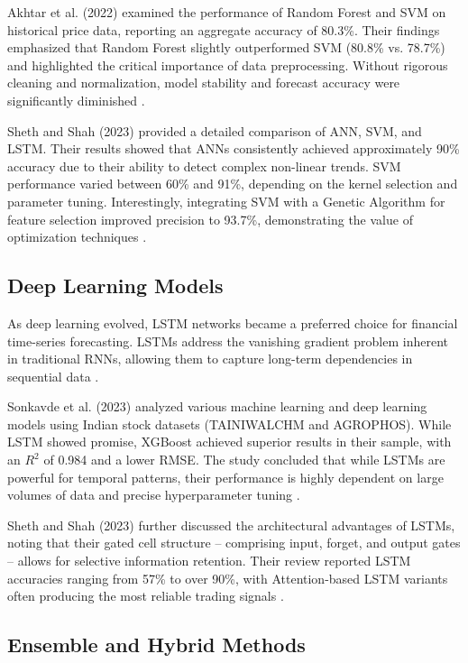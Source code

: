 \documentclass[11pt,a4paper]{article}
\begin{document}
Akhtar et al. (2022) examined the performance of Random Forest and SVM on historical price data,
reporting an aggregate accuracy of 80.3\%. Their findings emphasized that Random Forest slightly
outperformed SVM (80.8\% vs. 78.7\%) and highlighted the critical importance of data preprocessing.
Without rigorous cleaning and normalization, model stability and forecast accuracy were significantly
diminished \cite{akhtar2022}.

Sheth and Shah (2023) provided a detailed comparison of ANN, SVM, and LSTM. Their results showed
that ANNs consistently achieved approximately 90\% accuracy due to their ability to detect complex
non-linear trends. SVM performance varied between 60\% and 91\%, depending on the kernel selection
and parameter tuning. Interestingly, integrating SVM with a Genetic Algorithm for feature selection
improved precision to 93.7\%, demonstrating the value of optimization techniques \cite{sheth2023}.

\subsection{Deep Learning Models}

As deep learning evolved, LSTM networks became a preferred choice for financial time-series
forecasting. LSTMs address the vanishing gradient problem inherent in traditional RNNs, allowing
them to capture long-term dependencies in sequential data \cite{sonkavde2023}.

Sonkavde et al. (2023) analyzed various machine learning and deep learning models using Indian
stock datasets (TAINIWALCHM and AGROPHOS). While LSTM showed promise, XGBoost achieved
superior results in their sample, with an $R^2$ of 0.984 and a lower RMSE. The study concluded that
while LSTMs are powerful for temporal patterns, their performance is highly dependent on large
volumes of data and precise hyperparameter tuning \cite{sonkavde2023}.

Sheth and Shah (2023) further discussed the architectural advantages of LSTMs, noting that their
gated cell structure -- comprising input, forget, and output gates -- allows for selective information
retention. Their review reported LSTM accuracies ranging from 57\% to over 90\%, with
Attention-based LSTM variants often producing the most reliable trading signals \cite{sheth2023}.

\subsection{Ensemble and Hybrid Methods}
\end{document}
